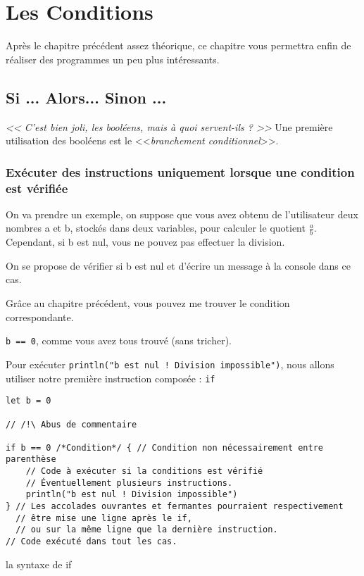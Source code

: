 \chapter{Les Conditions}
Après le chapitre précédent assez théorique, ce chapitre vous permettra enfin de réaliser des programmes un peu plus intéressants.
\section{Si ... Alors... Sinon ...}
\emph{<< C'est bien joli, les booléens, mais à quoi servent-ils ? >>}
Une première utilisation des booléens est le <<\emph{branchement conditionnel}>>.
\subsection{Exécuter des instructions uniquement lorsque une condition est vérifiée}
On va prendre un exemple, on suppose que vous avez obtenu de l'utilisateur deux nombres a et b, stockés dans deux variables, pour calculer le quotient $\frac{a}{b}$.
Cependant, si b est nul, vous ne pouvez pas effectuer la division. %

On se propose de vérifier si b est nul et d'écrire un message à la console dans ce cas.

Grâce au chapitre précédent, vous pouvez me trouver le condition correspondante.

\pagebreak %
\texttt{b == 0}, comme vous avez tous trouvé (sans tricher).

Pour exécuter \texttt{println("b est nul ! Division impossible")}, nous allons utiliser notre première instruction composée : \texttt{if}

\begin{listing}[h]
\begin{verbatim}
let b = 0

// /!\ Abus de commentaire

if b == 0 /*Condition*/ { // Condition non nécessairement entre parenthèse
    // Code à exécuter si la conditions est vérifié
    // Éventuellement plusieurs instructions.
    println("b est nul ! Division impossible")
} // Les accolades ouvrantes et fermantes pourraient respectivement
  // être mise une ligne après le if,
  // ou sur la même ligne que la dernière instruction.
// Code exécuté dans tout les cas.
\end{verbatim}
\caption{la syntaxe de if}
\end{listing}
